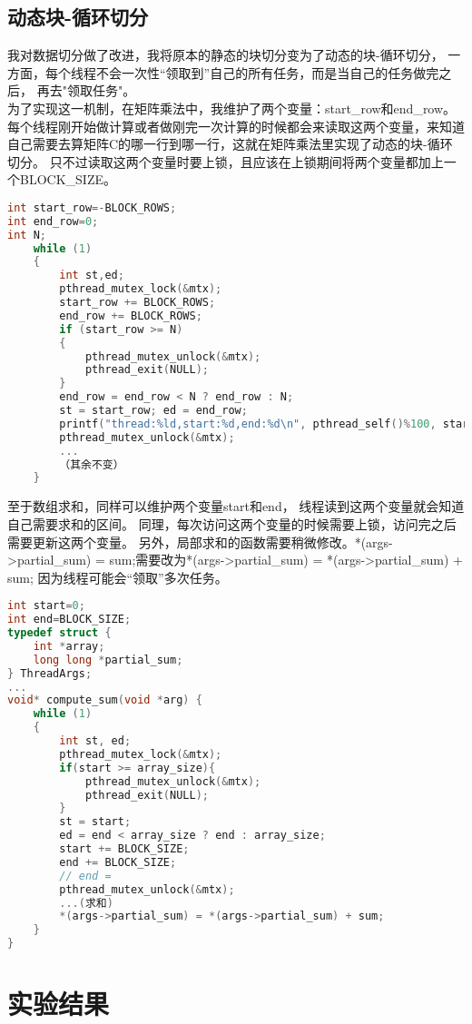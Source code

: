 \documentclass{SYSUReport}
\begin{document}
\subsection{动态块-循环切分}
我对数据切分做了改进，我将原本的静态的块切分变为了动态的块-循环切分，
一方面，每个线程不会一次性“领取到”自己的所有任务，而是当自己的任务做完之后，
再去"领取任务"。\\
为了实现这一机制，在矩阵乘法中，我维护了两个变量：start\_row和end\_row。
每个线程刚开始做计算或者做刚完一次计算的时候都会来读取这两个变量，来知道
自己需要去算矩阵C的哪一行到哪一行，这就在矩阵乘法里实现了动态的块-循环切分。
只不过读取这两个变量时要上锁，且应该在上锁期间将两个变量都加上一个BLOCK\_SIZE。
\begin{lstlisting}[language=c]
int start_row=-BLOCK_ROWS;
int end_row=0;
int N;
    while (1)
    {
        int st,ed;
        pthread_mutex_lock(&mtx);
        start_row += BLOCK_ROWS;
        end_row += BLOCK_ROWS;
        if (start_row >= N)
        {
            pthread_mutex_unlock(&mtx);
            pthread_exit(NULL);
        }
        end_row = end_row < N ? end_row : N;
        st = start_row; ed = end_row;
        printf("thread:%ld,start:%d,end:%d\n", pthread_self()%100, start_row, end_row);
        pthread_mutex_unlock(&mtx);
        ...
        （其余不变）
    }
\end{lstlisting}
至于数组求和，同样可以维护两个变量start和end，
线程读到这两个变量就会知道自己需要求和的区间。
同理，每次访问这两个变量的时候需要上锁，访问完之后需要更新这两个变量。
另外，局部求和的函数需要稍微修改。*(args->partial\_sum) = sum;需要改为*(args->partial\_sum) = *(args->partial\_sum) + sum;
因为线程可能会“领取”多次任务。
\begin{lstlisting}[language=c]
int start=0;
int end=BLOCK_SIZE;
typedef struct {
    int *array;
    long long *partial_sum;
} ThreadArgs;
...
void* compute_sum(void *arg) {
    while (1)
    {
        int st, ed;
        pthread_mutex_lock(&mtx);
        if(start >= array_size){
            pthread_mutex_unlock(&mtx);
            pthread_exit(NULL);
        }
        st = start;
        ed = end < array_size ? end : array_size;
        start += BLOCK_SIZE;
        end += BLOCK_SIZE;
        // end = 
        pthread_mutex_unlock(&mtx);
        ...(求和)
        *(args->partial_sum) = *(args->partial_sum) + sum;
    }
}
\end{lstlisting}


\section{实验结果}
\end{document}
